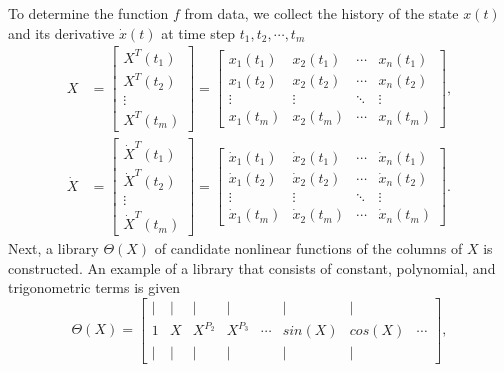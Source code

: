 To determine the function $f$ from data, we collect the history of the state $x(t)$ and its derivative $\dot{x}(t)$ at time step $t_1, t_2, \cdots, t_m$
\begin{align*}
    X &=
    \begin{bmatrix}
        X^T(t_1) \\
        X^T(t_2) \\
        \vdots \\
        X^T(t_m)
    \end{bmatrix} =
    \begin{bmatrix}
        x_1(t_1) & x_2(t_1) & \cdots & x_n(t_1) \\
        x_1(t_2) & x_2(t_2) & \cdots & x_n(t_2) \\
        \vdots & \vdots & \ddots & \vdots \\
        x_1(t_m) & x_2(t_m) & \cdots & x_n(t_m)
    \end{bmatrix}, \\
    \dot{X} &=
    \begin{bmatrix}
        \dot{X}^T(t_1) \\
        \dot{X}^T(t_2) \\
        \vdots \\
        \dot{X}^T(t_m)
    \end{bmatrix} =
    \begin{bmatrix}
        \dot{x}_1(t_1) & \dot{x}_2(t_1) & \cdots & \dot{x}_n(t_1) \\
        \dot{x}_1(t_2) & \dot{x}_2(t_2) & \cdots & \dot{x}_n(t_2) \\
        \vdots & \vdots & \ddots & \vdots \\
        \dot{x}_1(t_m) & \dot{x}_2(t_m) & \cdots & \dot{x}_n(t_m)
    \end{bmatrix}.
\end{align*}
Next, a library $\Theta(X)$ of candidate nonlinear functions of the columns of $X$ is constructed.
An example of a library that consists of constant, polynomial, and trigonometric terms is given
\begin{equation*}
    \Theta(X) = \begin{bmatrix}
        | & | & |       & |       &        & |      & |      & \\
        1 & X & X^{P_2} & X^{P_3} & \cdots & sin(X) & cos(X) & \cdots \\
        | & | & |       & |       &        & |      & |      &
    \end{bmatrix},
\end{equation*}

